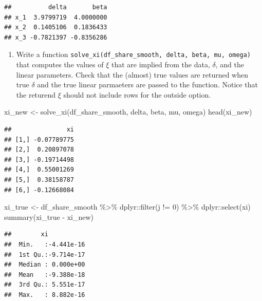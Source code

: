 \documentclass[
]{book}
\newenvironment{Shaded}{\begin{snugshade}}{\end{snugshade}}
\newcommand{\DecValTok}[1]{\textcolor[rgb]{0.00,0.00,0.81}{#1}}
\newcommand{\FunctionTok}[1]{\textcolor[rgb]{0.00,0.00,0.00}{#1}}
\newcommand{\NormalTok}[1]{#1}
\newcommand{\OtherTok}[1]{\textcolor[rgb]{0.56,0.35,0.01}{#1}}
\newcommand{\SpecialCharTok}[1]{\textcolor[rgb]{0.00,0.00,0.00}{#1}}
\providecommand{\tightlist}{%
  \setlength{\itemsep}{0pt}\setlength{\parskip}{0pt}}
\begin{document}
\begin{verbatim}
##          delta       beta
## x_1  3.9799719  4.0000000
## x_2  0.1405106  0.1836433
## x_3 -0.7821397 -0.8356286
\end{verbatim}

\begin{enumerate}
\def\labelenumi{\arabic{enumi}.}
\setcounter{enumi}{10}
\tightlist
\item
  Write a function \texttt{solve\_xi(df\_share\_smooth,\ delta,\ beta,\ mu,\ omega)} that computes the values of \(\xi\) that are implied from the data, \(\delta\), and the linear parameters. Check that the (almost) true values are returned when true \(\delta\) and the true linear parmaeters are passed to the function. Notice that the returend \(\xi\) should not include rows for the outside option.
\end{enumerate}

\begin{Shaded}
\begin{Highlighting}[]
\NormalTok{xi\_new }\OtherTok{\textless{}{-}} \FunctionTok{solve\_xi}\NormalTok{(df\_share\_smooth, delta, beta, mu, omega)}
\FunctionTok{head}\NormalTok{(xi\_new)}
\end{Highlighting}
\end{Shaded}

\begin{verbatim}
##               xi
## [1,] -0.07789775
## [2,]  0.20897078
## [3,] -0.19714498
## [4,]  0.55001269
## [5,]  0.38158787
## [6,] -0.12668084
\end{verbatim}

\begin{Shaded}
\begin{Highlighting}[]
\NormalTok{xi\_true }\OtherTok{\textless{}{-}}
\NormalTok{  df\_share\_smooth }\SpecialCharTok{\%\textgreater{}\%}
\NormalTok{  dplyr}\SpecialCharTok{::}\FunctionTok{filter}\NormalTok{(j }\SpecialCharTok{!=} \DecValTok{0}\NormalTok{) }\SpecialCharTok{\%\textgreater{}\%}
\NormalTok{  dplyr}\SpecialCharTok{::}\FunctionTok{select}\NormalTok{(xi)}
\FunctionTok{summary}\NormalTok{(xi\_true }\SpecialCharTok{{-}}\NormalTok{ xi\_new)}
\end{Highlighting}
\end{Shaded}

\begin{verbatim}
##        xi            
##  Min.   :-4.441e-16  
##  1st Qu.:-9.714e-17  
##  Median : 0.000e+00  
##  Mean   :-9.388e-18  
##  3rd Qu.: 5.551e-17  
##  Max.   : 8.882e-16
\end{verbatim}
\end{document}
